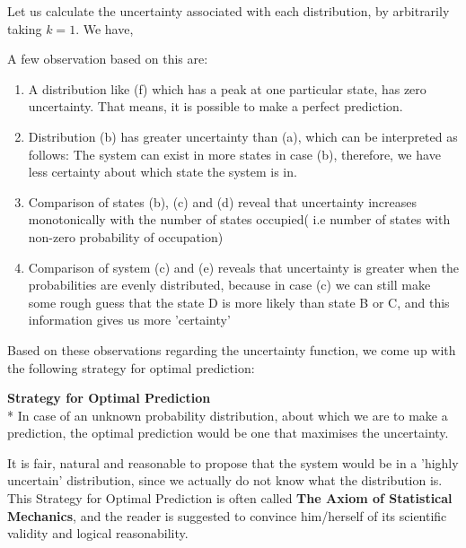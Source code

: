 \documentclass[oneside]{book}
\begin{document}

Let us calculate the uncertainty associated with each distribution, by arbitrarily taking $k= 1$. We have,\\

A few observation based on this are:
\begin{enumerate}
\item A distribution like (f) which has a peak at one particular state, has zero uncertainty. That means, it is possible to make a perfect prediction.
\item Distribution (b) has greater uncertainty than (a), which can be interpreted as follows: The system can exist in more states in case (b), therefore, we have less certainty about which state the system is in. 
\item Comparison of states (b), (c) and (d) reveal that uncertainty increases monotonically with the number of states occupied( i.e number of states with non-zero probability of occupation)
\item Comparison of system (c) and (e) reveals that uncertainty is greater when the probabilities are evenly distributed, because in case (c) we can still make some rough guess that the state D is more likely than state B or C, and this information gives us more 'certainty'
\end{enumerate}

Based on these observations regarding the uncertainty function, we come up with the following strategy for optimal prediction:
\begin{mdframed}[style=exercise]
\textbf{Strategy for Optimal Prediction}
 \\* In case of an unknown probability distribution, about which we are to make a prediction, the optimal prediction would be one that maximises the uncertainty.
 \end{mdframed}
 
It is fair, natural and reasonable to propose that the system would be in a 'highly uncertain' distribution, since we actually do not know what the distribution is. This Strategy for Optimal Prediction is often called \textbf{The Axiom of Statistical Mechanics}, and the reader is suggested to convince him/herself of its scientific validity and logical reasonability.\\
\end{document}
